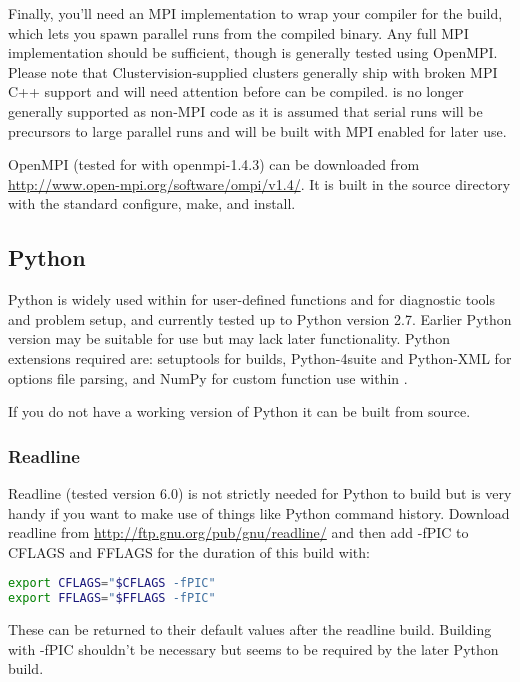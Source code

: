 Finally, you'll need an MPI implementation to wrap your compiler for the
\fluidity build, which lets you spawn parallel runs from the compiled \fluidity
binary. Any full MPI implementation should be sufficient, though \fluidity is
generally tested using OpenMPI. Please note that Clustervision-supplied
clusters generally ship with broken MPI C++ support and will need attention
before \fluidity can be compiled. \fluidity is no longer generally supported as
non-MPI code as it is assumed that serial runs will be precursors to large
parallel runs and will be built with MPI enabled for later use.

OpenMPI (tested for \fluidity with openmpi-1.4.3) can be downloaded from
\url{http://www.open-mpi.org/software/ompi/v1.4/}. It is built in the source
directory with the standard configure, make, and install.

\subsection{Python}
\label{sec:required_libraries_python}

Python is widely used within \fluidity for user-defined functions and for
diagnostic tools and problem setup, and currently tested up to Python version
2.7. Earlier Python version may be suitable for use but may lack later
functionality. Python extensions required are: setuptools for \fluidity builds,
Python-4suite and Python-XML for options file parsing, and NumPy for custom
function use within \fluidity.

If you do not have a working version of Python it can be built from source. 

\subsubsection{Readline}
\label{sec:required_libraries_python_readline}

Readline (tested version 6.0) is not strictly needed for Python to build but is
very handy if you want to make use of things like Python command history.
Download readline from \url{http://ftp.gnu.org/pub/gnu/readline/} and then add
-fPIC to CFLAGS and FFLAGS for the duration of this build with:

\begin{lstlisting}[language=bash]
export CFLAGS="$CFLAGS -fPIC"
export FFLAGS="$FFLAGS -fPIC"
\end{lstlisting}

These can be returned to their default values after the readline build.
Building with -fPIC shouldn't be necessary but seems to be required by the
later Python build.

